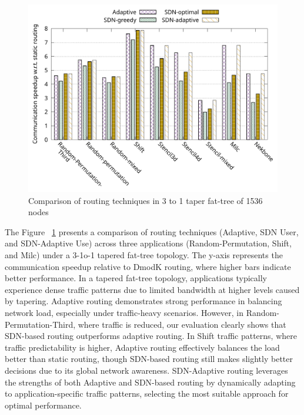 \begin{figure}[h]
  \centering
  \includegraphics[width=\columnwidth]{./figs_4/routing_taper.pdf}
  \caption{Comparison of routing techniques in 3 to 1 taper fat-tree of 1536 nodes}
  \label{fig:routing_taper}
\end{figure}


The Figure ~\ref{fig:routing_taper} presents a comparison of routing techniques (Adaptive, SDN User, and SDN-Adaptive Use) across three applications (Random-Permutation, Shift, and Milc) under a 3-1o-1 tapered fat-tree topology. The y-axis represents the communication speedup relative to DmodK routing, where higher bars indicate better performance. In a tapered fat-tree topology, applications typically experience dense traffic patterns due to limited bandwidth at higher levels caused by tapering. Adaptive routing demonstrates strong performance in balancing network load, especially under traffic-heavy scenarios. However, in Random-Permutation-Third, where traffic is reduced, our evaluation clearly shows that SDN-based routing outperforms adaptive routing. In Shift traffic patterns, where traffic predictability is higher, Adaptive routing effectively balances the load better than static routing, though SDN-based routing still makes slightly better decisions due to its global network awareness. SDN-Adaptive routing leverages the strengths of both Adaptive and SDN-based routing by dynamically adapting to application-specific traffic patterns, selecting the most suitable approach for optimal performance. 

